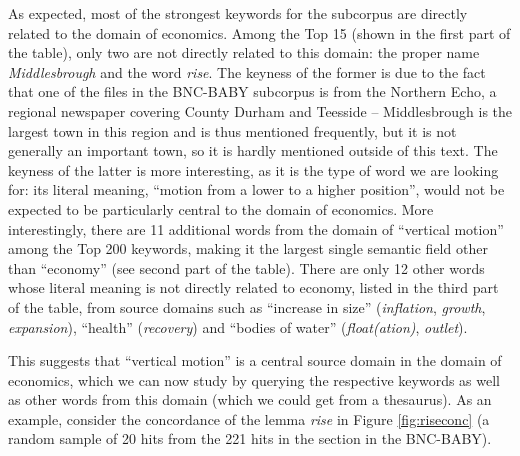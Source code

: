 As expected, most of the strongest keywords for the subcorpus are directly related to the domain of economics. Among the Top 15 (shown in the first part of the table), only two are not directly related to this domain: the proper name \textit{Middlesbrough} and the word \textit{rise}. The keyness of the former is due to the fact that one of the files in the BNC-BABY  subcorpus is from the Northern Echo, a regional newspaper covering County Durham and Teesside -- Middlesbrough is the largest town in this region and is thus mentioned frequently, but it is not generally an important town, so it is hardly mentioned outside of this text. The keyness of the latter is more interesting, as it is the type of word we are looking for: its literal meaning, ``motion from a lower to a higher position'', would not be expected to be particularly central to the domain of economics. More interestingly, there are 11 additional words from the domain of ``vertical motion'' among the Top 200 keywords, making it the largest single semantic field other than ``economy'' (see second part of the table). There are only 12 other words whose literal meaning is not directly related to economy, listed in the third part of the table, from source domains such as ``increase in size'' (\textit{inflation}, \textit{growth}, \textit{expansion}), ``health'' (\textit{recovery}) and ``bodies of water'' (\textit{float(ation)}, \textit{outlet}).

This suggests that ``vertical motion'' is a central source domain in the domain of economics, which we can now study by querying the respective keywords as well as other words from this domain (which we could get from a thesaurus). As an example, consider the concordance of the lemma \textit{rise} in Figure \ref{fig:riseconc} (a random sample of 20 hits from the 221 hits in the  section in the BNC-BABY).


